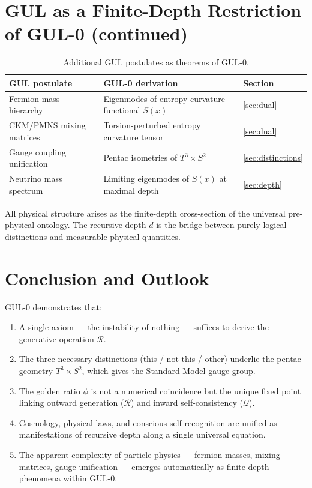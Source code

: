 \documentclass[11pt]{article}
\begin{document}
\section{GUL as a Finite-Depth Restriction of GUL-0 (continued)}
\label{sec:relationship_continued}

\begin{table}[htbp]
\centering
\caption{Additional GUL postulates as theorems of GUL-0.}
\label{tab:relationship2}
\begin{tabular}{@{}lll@{}}
\toprule
GUL postulate & GUL-0 derivation & Section \\
\midrule
Fermion mass hierarchy
  & Eigenmodes of entropy curvature functional $S(x)$
  & \ref{sec:dual} \\
CKM/PMNS mixing matrices
  & Torsion-perturbed entropy curvature tensor
  & \ref{sec:dual} \\
Gauge coupling unification
  & Pentac isometries of $T^3\times S^2$
  & \ref{sec:distinctions} \\
Neutrino mass spectrum
  & Limiting eigenmodes of $S(x)$ at maximal depth
  & \ref{sec:depth} \\
\bottomrule
\end{tabular}
\end{table}

All physical structure arises as the finite-depth cross-section of
the universal pre-physical ontology. The recursive depth $d$ is the
bridge between purely logical distinctions and measurable physical
quantities.

\section{Conclusion and Outlook}
\label{sec:conclusion_outlook}

GUL-0 demonstrates that:

\begin{enumerate}
  \item A single axiom --- the instability of nothing --- suffices
        to derive the generative operation $\mathcal{R}$.
  \item The three necessary distinctions (this / not-this / other)
        underlie the pentac geometry $T^3\times S^2$, which gives
        the Standard Model gauge group.
  \item The golden ratio $\phi$ is not a numerical coincidence but
        the unique fixed point linking outward generation
        ($\mathcal{R}$) and inward self-consistency ($\mathcal{Q}$).
  \item Cosmology, physical laws, and conscious self-recognition
        are unified as manifestations of recursive depth along
        a single universal equation.
  \item The apparent complexity of particle physics --- fermion
        masses, mixing matrices, gauge unification --- emerges
        automatically as finite-depth phenomena within GUL-0.
\end{enumerate}
\end{document}
